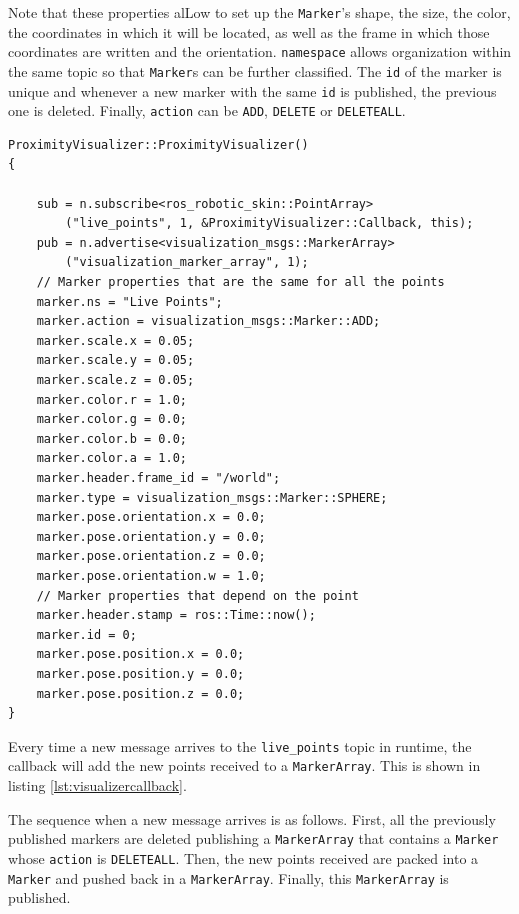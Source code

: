 Note that these properties alLow to set up the \lstinline{Marker}'s shape, the size, the color, the coordinates in which it will be located, as well as the frame in which those coordinates are written and the orientation. \lstinline{namespace} allows organization within the same topic so that \lstinline{Marker}s can be further classified. The \lstinline{id} of the marker is unique and whenever a new marker with the same \lstinline{id} is published, the previous one is deleted. Finally, \lstinline{action} can be \lstinline{ADD}, \lstinline{DELETE} or \lstinline{DELETEALL}.

\begin{lstlisting}[caption={Initializer of the ProximityVisualizer class},captionpos=b,label={lst:proximityinitializer}]
ProximityVisualizer::ProximityVisualizer()
{

    sub = n.subscribe<ros_robotic_skin::PointArray>
        ("live_points", 1, &ProximityVisualizer::Callback, this);
    pub = n.advertise<visualization_msgs::MarkerArray>
        ("visualization_marker_array", 1);
    // Marker properties that are the same for all the points
    marker.ns = "Live Points";
    marker.action = visualization_msgs::Marker::ADD;
    marker.scale.x = 0.05;
    marker.scale.y = 0.05;
    marker.scale.z = 0.05;
    marker.color.r = 1.0;
    marker.color.g = 0.0;
    marker.color.b = 0.0;
    marker.color.a = 1.0;
    marker.header.frame_id = "/world";
    marker.type = visualization_msgs::Marker::SPHERE;
    marker.pose.orientation.x = 0.0;
    marker.pose.orientation.y = 0.0;
    marker.pose.orientation.z = 0.0;
    marker.pose.orientation.w = 1.0;
    // Marker properties that depend on the point
    marker.header.stamp = ros::Time::now();
    marker.id = 0;
    marker.pose.position.x = 0.0;
    marker.pose.position.y = 0.0;
    marker.pose.position.z = 0.0;
}
\end{lstlisting}

Every time a new message arrives to the \lstinline{live_points} topic in runtime, the callback will add the new points received  to a \lstinline{MarkerArray}. This is shown in listing \ref{lst:visualizercallback}.

The sequence when a new message arrives is as follows. First, all the previously published markers are deleted publishing a \lstinline{MarkerArray} that contains a \lstinline{Marker} whose \lstinline{action} is \lstinline{DELETEALL}. Then, the new points received are packed into a \lstinline{Marker} and pushed back in a \lstinline{MarkerArray}. Finally, this \lstinline{MarkerArray} is published.

